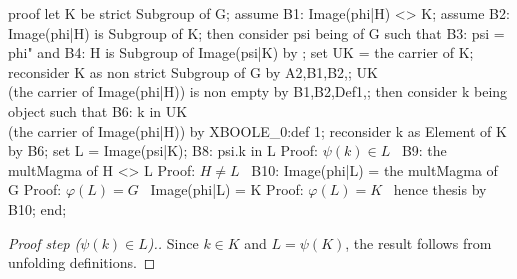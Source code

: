 \nwenddocs{}\endmoddef\nwstartdeflinemarkup{}\nwenddeflinemarkup
proof
  let K be strict Subgroup of G;
  assume B1: Image(phi|H) <> K;
  assume B2: Image(phi|H) is Subgroup of K;
  then consider psi being  of G such that
  B3: psi = phi" and
  B4: H is Subgroup of Image(psi|K)
  by ;
  set UK = the carrier of K;
  reconsider K as non  strict Subgroup of G by A2,B1,B2,;
  UK \\ (the carrier of Image(phi|H)) is non empty by B1,B2,Def1,;
  then consider k being object such that
  B6: k in UK \\ (the carrier of Image(phi|H))
  by XBOOLE_0:def 1;
  reconsider k as Element of K by B6;
  set L = Image(psi|K);
  B8: psi.k in L
  \LA{}Proof: $\psi(k)\in L$~{\nwtagstyle{}}\RA{}
  B9: the multMagma of H <> L
  \LA{}Proof: $H\neq L$~{\nwtagstyle{}}\RA{}
  B10: Image(phi|L) = the multMagma of G
  \LA{}Proof: $\varphi(L)=G$~{\nwtagstyle{}}\RA{}
  Image(phi|L) = K
  \LA{}Proof: $\varphi(L) = K$~{\nwtagstyle{}}\RA{}
  hence thesis by B10;
end;
\nwendcode{}\nwdocspar

\begin{proof}[Proof step ($\psi(k)\in L$).]
Since $k\in K$ and $L=\psi(K)$, the result follows from unfolding definitions.
\end{proof}

